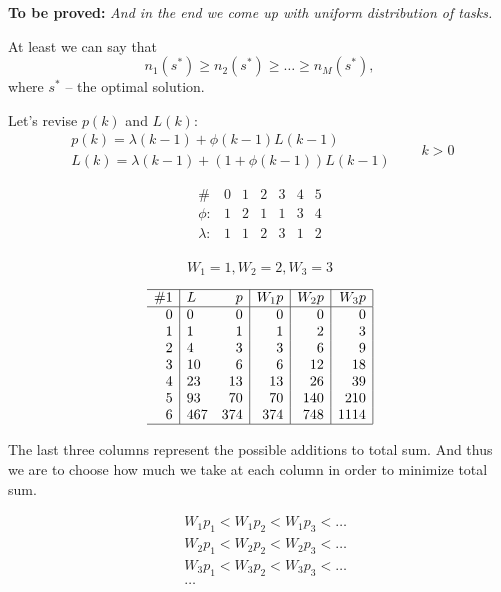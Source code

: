 \documentclass{amsart}
\begin{document}
\textbf{To be proved:}
{\it And in the end we come up
with uniform distribution of tasks.}

At least we can say that
\[
  n_1(s^*) \geqslant n_2(s^*) \geqslant \dots \geqslant n_M(s^*),
\]
where $s^*$ -- the optimal solution.

Let's revise $p(k)$ and $L(k)$:
\[
  \begin{aligned}
    p(k) = \lambda(k-1) + \phi(k-1)L(k-1) & \\
    L(k) = \lambda(k-1) + (1 + \phi(k-1))L(k-1) &
  \end{aligned}
  \quad k > 0
\]

\begin{multicols}{2}
  \[
    \begin{array}{r|rrrrrr}
      \# & 0 & 1 & 2 & 3 & 4 & 5 \\
      \hline
      \phi:     & 1 & 2 & 1 & 1 & 3 & 4 \\
      \lambda:  & 1 & 1 & 2 & 3 & 1 & 2 \\
    \end{array}
  \]

  \[
    W_1 = 1, W_2 = 2, W_3 = 3
  \]

  \hfill

  \[
    \begin{array}{r|lr|r|r|r|}
      \hline
      \#1 & L   & p   & W_1p & W_2p & W_3p \\
      \hline
      0   & 0   & 0   & 0    & 0    & 0     \\
      1   & 1   & 1   & 1    & 2    & 3     \\
      2   & 4   & 3   & 3    & 6    & 9     \\
      3   & 10  & 6   & 6    & 12   & 18    \\
      4   & 23  & 13  & 13   & 26   & 39    \\
      5   & 93  & 70  & 70   & 140  & 210   \\
      6   & 467 & 374 & 374  & 748  & 1114  \\
      \hline
    \end{array}
  \]
\end{multicols}

The last three columns represent the possible additions to total
sum. And thus we are to choose how much we take at each column
in order to minimize total sum.

\[
  \begin{aligned}
    & W_1p_1 <W_1p_2 < W_1p_3 < \dots \\
    & W_2p_1 <W_2p_2 < W_2p_3 < \dots \\
    & W_3p_1 <W_3p_2 < W_3p_3 < \dots \\
    & \dots
  \end{aligned}
\]
\end{document}
